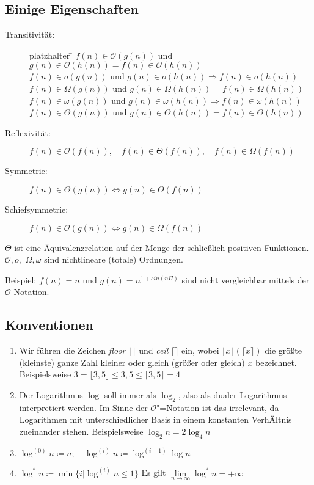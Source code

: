 \documentclass[ngerman,draft,parskip=half*,twoside]{scrreprt}
\theoremstyle{break}
\theoremstyle{nonumberbreak}
\newcommand*{\OO}{\mathcal{O}}      %
\begin{document}
\subsection{Einige Eigenschaften}
\begin{description}
\item[Transitivität:]
\begin{tabbing}
platzhalter \= \kill
        \> $f(n) \in \OO(g(n))$ und $g(n) \in \OO(h(n))=f(n) \in \OO(h(n))$\\
        \> $f(n) \in o(g(n))$ und $g(n) \in o(h(n)) \Rightarrow f(n) \in o(h(n))$\\
        \> $f(n) \in \Omega(g(n))$ und $g(n) \in \Omega(h(n))=f(n) \in \Omega(h(n))$\\
        \> $f(n) \in \omega(g(n))$ und $g(n) \in \omega(h(n)) \Rightarrow f(n) \in \omega(h(n))$\\
        \> $f(n) \in \Theta(g(n))$ und $g(n) \in \Theta(h(n))=f(n) \in \Theta(h(n))$
\end{tabbing}
\item[Reflexivität:]
        $f(n) \in \OO(f(n)), \quad f(n) \in \Theta(f(n)), \quad f(n) \in \Omega(f(n))$
\item[Symmetrie:]
        $f(n) \in \Theta(g(n)) \Leftrightarrow g(n) \in \Theta(f(n))$
\item[Schiefsymmetrie:]
        $f(n) \in \OO(g(n)) \Leftrightarrow g(n) \in \Omega(f(n))$
\end{description}
$\Theta$ ist eine Äquivalenzrelation auf der Menge der schließlich positiven Funktionen.
$\OO,o,$ $\Omega,\omega$ sind nichtlineare (totale) Ordnungen.

Beispiel: $f(n)=n$ und $g(n)=n^{1+sin(n\Pi)}$ sind nicht vergleichbar mittels der $\OO$-Notation.

\subsection{Konventionen}
\begin{enumerate}
\item   Wir führen die Zeichen \emph{floor} $ \lfloor \rfloor$ und \emph{ceil} $\lceil \rceil$ ein,
        wobei $\lfloor x \rfloor ( \lceil x \rceil)$ die größte (kleinste) ganze Zahl kleiner oder gleich
        (größer oder gleich) $x$ bezeichnet. Beispielsweise $3=\lfloor 3,5\rfloor \leq 3,5 \leq \lceil 3,5 \rceil=4$
\item   Der Logarithmus $\log$ soll immer als $\log_2$, also als dualer Logarithmus interpretiert werden. Im Sinne der $\OO$"=Notation ist das
irrelevant, da Logarithmen mit unterschiedlicher Basis in einem konstanten VerhÄltnis zueinander stehen. Beispielsweise $\log_2 n = 2 \log_4 n$
\item   $\log^{(0)}n \coloneqq n; \quad \log^{(i)}n \coloneqq \log^{(i-1)}\log n$
\item   $\log^{*}n \coloneqq \min \{i |\log^{(i)}n \leq1 \}$ Es gilt $ \lim\limits_{n \rightarrow \infty}{\log^{*}n} = + \infty$
\end{enumerate}
\end{document}

